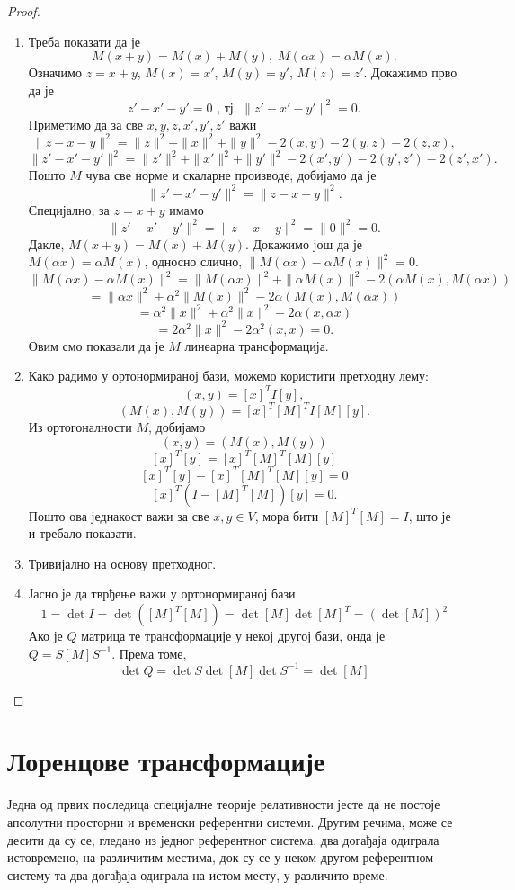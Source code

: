 \documentclass{report}
\theoremstyle{plain}
\theoremstyle{definition}
\begin{document}
\begin{proof}
\begin{enumerate}
  \item Треба показати да је
  $$M(x+y) = M(x)+M(y), \; M(\alpha x) = \alpha M(x).$$
  Означимо $z = x+y$, $M(x)=x'$, $M(y)=y'$, $M(z)=z'$. Докажимо прво да је
  $$z'-x'-y' = 0 \text{ , тј. } \|z'-x'-y'\|^2 = 0.$$
  Приметимо да за све $x, y, z, x', y', z'$ важи
  $$\|z-x-y\|^2 = \|z\|^2+\|x\|^2+\|y\|^2 - 2(x, y) -2(y, z) - 2(z, x),$$
  $$\|z'-x'-y'\|^2 = \|z'\|^2+\|x'\|^2+\|y'\|^2 - 2(x', y') -2(y', z') - 2(z', x').$$
  Пошто $M$ чува све норме и скаларне производе, добијамо да је
  $$\|z'-x'-y'\|^2 = \|z-x-y\|^2.$$
  Специјално, за $z=x+y$ имамо
  $$\|z'-x'-y'\|^2 = \|z-x-y\|^2 = \|0\|^2 = 0.$$
  Дакле, $M(x+y) = M(x)+M(y)$. Докажимо још да је $M(\alpha x) = \alpha M(x)$, односно слично, $\|M(\alpha x) - \alpha M(x)\|^2 = 0$.
  $$\|M(\alpha x) - \alpha M(x)\|^2 = \|M(\alpha x)\|^2 + \|\alpha M(x)\|^2 - 2(\alpha M(x), M(\alpha x))$$
  $$ = \|\alpha x\|^2 + \alpha^2 \|M(x)\|^2 - 2\alpha(M(x), M(\alpha x))$$
  $$ = \alpha^2\|x\|^2 + \alpha^2 \|x\|^2 - 2\alpha(x, \alpha x)$$
  $$ = 2\alpha^2\|x\|^2 - 2\alpha^2 (x, x) = 0.$$
  Овим смо показали да је $M$ линеарна трансформација.
  \item Како радимо у ортонормираној бази, можемо користити претходну лему:
  $$(x, y) = [x]^TI[y],$$
  $$(M(x), M(y)) = [x]^T[M]^TI[M][y].$$
  Из ортогоналности $M$, добијамо
  $$(x, y) = (M(x), M(y))$$
  $$[x]^T[y] = [x]^T[M]^T[M][y]$$
  $$[x]^T[y] - [x]^T[M]^T[M][y] = 0$$
  $$[x]^T(I-[M]^T[M])[y] = 0.$$
  Пошто ова једнакост важи за све $x, y\in V$, мора бити $[M]^T [M] = I$, што је и требало показати.
  \item Тривијално на основу претходног.
  \item Јасно је да тврђење важи у ортонормираној бази.
  $$1 = \det I = \det([M]^T[M]) = \det [M] \det {[M]^T} = (\det [M])^2$$
  Ако је $Q$ матрица те трансформације у некој другој бази, онда је $Q = S[M]S^{-1}$. Према томе,
  $$\det Q = \det S \det [M] \det S^{-1} = \det [M]$$
\end{enumerate}
\end{proof}

\section{Лоренцове трансформације}

Једна од првих последица специјалне теорије релативности јесте да не постоје апсолутни просторни и временски референтни системи. Другим речима, може се десити да су се, гледано из једног референтног система, два догађаја одиграла истовремено, на различитим местима, док су се у неком другом референтном систему та два догађаја одиграла на истом месту, у различито време.
\end{document}
